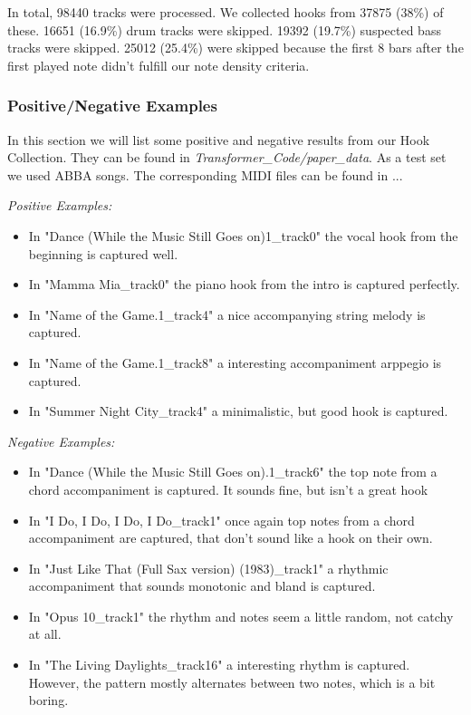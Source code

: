 \documentclass[a4paper,12pt]{extarticle}
\begin{document}
In total, 98440 tracks were processed. We collected hooks from 37875 (38\%) of these. 16651 (16.9\%) drum tracks were skipped. 19392 (19.7\%) suspected bass tracks were skipped. 25012 (25.4\%) were skipped because the first 8 bars after the first played note didn't fulfill our note density criteria.

\subsubsection{Positive/Negative Examples}
In this section we will list some positive and negative results from our Hook Collection. They can be found in \textit{Transformer\_Code/paper\_data}. As a test set we used ABBA songs. The corresponding MIDI files can be found in ... \newline

\textit{Positive Examples:}

\begin{itemize}
    \item In "Dance (While the Music Still Goes on)1\_track0" the vocal hook from the beginning is captured well.
    \item In "Mamma Mia\_track0" the piano hook from the intro is captured perfectly.
    \item In "Name of the Game.1\_track4" a nice accompanying string melody is captured.
    \item In "Name of the Game.1\_track8" a interesting accompaniment arppegio is captured.
    \item In "Summer Night City\_track4" a minimalistic, but good hook is captured.
\end{itemize}

\textit{Negative Examples:}

\begin{itemize}
    \item In "Dance (While the Music Still Goes on).1\_track6" the top note from a chord accompaniment is captured. It sounds fine, but isn't a great hook
    \item In "I Do, I Do, I Do, I Do\_track1" once again top notes from a chord accompaniment are captured, that don't sound like a hook on their own.
    \item In "Just Like That (Full Sax version) (1983)\_track1" a rhythmic accompaniment that sounds monotonic and bland is captured.
    \item In "Opus 10\_track1" the rhythm and notes seem a little random, not catchy at all.
    \item In "The Living Daylights\_track16" a interesting rhythm is captured. However, the pattern mostly alternates between two notes, which is a bit boring.
\end{itemize}
\end{document}
